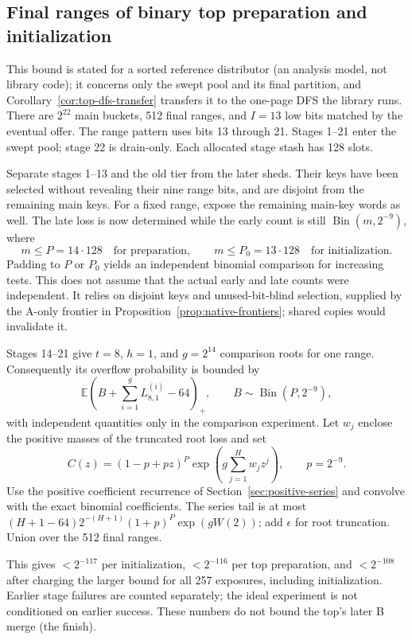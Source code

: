 \documentclass[11pt]{article}
\theoremstyle{definition}
\theoremstyle{remark}
\newcommand{\E}{\mathbb E}
\newcommand{\Bin}{\operatorname{Bin}}
\begin{document}
\subsection{Final ranges of binary top preparation and initialization}
\label{sec:top-final-ranges}
This bound is stated for a sorted reference distributor (an analysis model,
not library code); it concerns only the swept pool and its final
partition, and Corollary~\ref{cor:top-dfs-transfer} transfers it to the
one-page DFS the library runs.
There are $2^{22}$ main buckets, 512 final ranges, and $I=13$ low bits
matched by the eventual offer. The range pattern uses bits 13 through 21.
Stages 1--21 enter the swept pool; stage 22 is drain-only. Each allocated
stage stash has 128 slots.

Separate stages 1--13 and the old tier from the later sheds. Their keys
have been selected without revealing their nine range bits, and are
disjoint from the remaining main keys. For a fixed range, expose the
remaining main-key words as well. The late loss is now determined while
the early count is still $\Bin(m,2^{-9})$, where
\[
 m\le P=14\cdot128\quad\text{for preparation},\qquad
 m\le P_0=13\cdot128\quad\text{for initialization}.
\]
Padding to $P$ or $P_0$ yields an independent binomial comparison for
increasing tests. This does not assume that the actual early and late
counts were independent. It relies on disjoint keys and unused-bit-blind
selection, supplied by the A-only frontier in
Proposition~\ref{prop:native-frontiers}; shared copies would invalidate it.

Stages 14--21 give $t=8$, $h=1$, and $g=2^{14}$ comparison roots for one
range. Consequently its overflow probability is bounded by
\[
 \E\left(B+\sum_{i=1}^{g}L_{8,1}^{(i)}-64\right)_+,
 \qquad B\sim\Bin(P,2^{-9}),
\]
with independent quantities only in the comparison experiment. Let $w_j$
enclose the positive masses of the truncated root loss and set
\[
 C(z)=(1-p+pz)^P\exp\left(g\sum_{j=1}^{H}w_jz^j\right),\qquad p=2^{-9}.
\]
Use the positive coefficient recurrence of Section~\ref{sec:positive-series}
and convolve with the exact binomial coefficients. The series tail is at
most $(H+1-64)2^{-(H+1)}(1+p)^P\exp(gW(2))$; add $\epsilon$ for root
truncation. Union over the 512 final ranges.

This gives $<2^{-117}$ per initialization, $<2^{-116}$ per top preparation,
and $<2^{-108}$ after charging the larger bound for all 257 exposures,
including initialization. Earlier stage failures are counted separately;
the ideal experiment is not conditioned on earlier success. These numbers
do not bound the top's later B merge (the finish).
\end{document}
